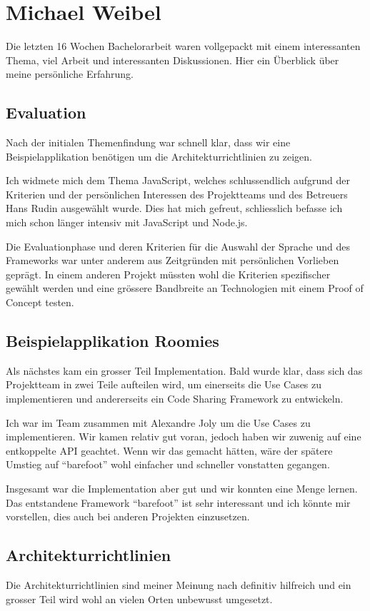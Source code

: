 \section{Michael Weibel}

Die letzten 16 Wochen Bachelorarbeit waren vollgepackt mit einem interessanten Thema, viel Arbeit und interessanten Diskussionen. Hier ein Überblick über meine persönliche Erfahrung.

\subsection*{Evaluation}
Nach der initialen Themenfindung war schnell klar, dass wir eine Beispielapplikation benötigen um die Architekturrichtlinien zu zeigen.

Ich widmete mich dem Thema JavaScript, welches schlussendlich aufgrund der Kriterien und der persönlichen Interessen des Projektteams und des Betreuers Hans Rudin ausgewählt wurde. Dies hat mich gefreut, schliesslich befasse ich mich schon länger intensiv mit JavaScript und Node.js.

Die Evaluationphase und deren Kriterien für die Auswahl der Sprache und des Frameworks war unter anderem aus Zeitgründen mit persönlichen Vorlieben geprägt. In einem anderen Projekt müssten wohl die Kriterien spezifischer gewählt werden und eine grössere Bandbreite an Technologien mit einem Proof of Concept testen.

\subsection*{Beispielapplikation Roomies}
Als nächstes kam ein grosser Teil Implementation. Bald wurde klar, dass sich das Projektteam in zwei Teile aufteilen wird, um einerseits die Use Cases zu implementieren und andererseits ein Code Sharing Framework zu entwickeln.

Ich war im Team zusammen mit Alexandre Joly um die Use Cases zu implementieren. Wir kamen relativ gut voran, jedoch haben wir zuwenig auf eine entkoppelte API geachtet. Wenn wir das gemacht hätten, wäre der spätere Umstieg auf ``barefoot'' wohl einfacher und schneller vonstatten gegangen.

Insgesamt war die Implementation aber gut und wir konnten eine Menge lernen. Das entstandene Framework ``barefoot'' ist sehr interessant und ich könnte mir vorstellen, dies auch bei anderen Projekten einzusetzen.

\subsection*{Architekturrichtlinien}
Die Architekturrichtlinien sind meiner Meinung nach definitiv hilfreich und ein grosser Teil wird wohl an vielen Orten unbewusst umgesetzt.

